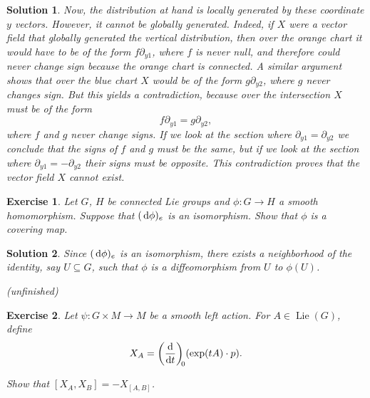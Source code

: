 \documentclass{article}
\newtheorem{ex}{Exercise}
\theoremstyle{nonumberplain}
\newtheorem{sol}{Solution}
\DeclareMathOperator{\Lie}{Lie}
\begin{document}
\begin{sol}
Now, the distribution at hand is locally generated by these coordinate $y$ vectors. However, it cannot be globally generated. Indeed, if $X$ were a vector field that globally generated the vertical distribution, then over the orange chart it would have to be of the form $f \partial_{y1}$, where $f$ is never null, and therefore could never change sign because the orange chart is connected. A similar argument shows that over the blue chart $X$ would be of the form $g \partial_{y2}$, where $g$ never changes sign. But this yields a contradiction, because over the intersection $X$ must be of the form
\[f \partial_{y1} = g \partial_{y2},\]
where $f$ and $g$ never change signs. If we look at the section where $\partial_{y1} = \partial_{y2}$ we conclude that the signs of $f$ and $g$ must be the same, but if we look at the section where $\partial_{y1} = - \partial_{y2}$ their signs must be opposite. This contradiction proves that the vector field $X$ cannot exist.
\end{sol}

\begin{ex}
Let $G$, $H$ be connected Lie groups and $\phi \colon G \to H$ a smooth homomorphism. Suppose that $(\dl \phi)_e$ is an isomorphism. Show that $\phi$ is a covering map.
\end{ex}

\begin{sol}
Since $(\dl \phi)_e$ is an isomorphism, there exists a neighborhood of the identity, say $U \subseteq G$, such that $\phi$ is a diffeomorphism from $U$ to $\phi(U)$.

(unfinished)
\end{sol}

\begin{ex}
Let $\psi \colon G \times M \to M$ be a smooth left action. For $A \in \Lie(G)$, define
\[X_A = \diff{}t[0] (\exp(tA) \cdot p).\]

Show that $[X_A, X_B] = - X_{[A,B]}$.
\end{ex}
\end{document}
